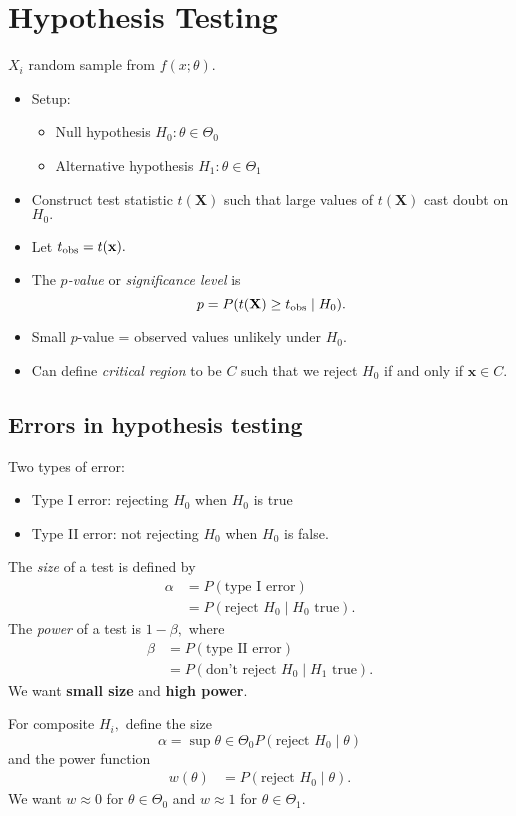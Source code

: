 \section{Hypothesis Testing}
$X_i$ random sample from $f(x; \theta).$
\begin{itemize}
	\item Setup:
		\begin{itemize}
			\item Null hypothesis $H_0\colon \theta \in \Theta_0$
			\item Alternative hypothesis $H_1\colon \theta \in \Theta_1$
		\end{itemize}
	\item Construct test statistic $t(\mathbf{X})$ such that large values of $t(\mathbf{X})$ cast doubt on $H_0.$
	\item Let $t_{\text{obs}} = t(\mathbf{x}).$
	\item The \textit{$p$-value} or \textit{significance level} is 
	\[ p = P(t(\mathbf{X}) \geq t_{\text{obs}} \mid H_0). \]
	\item Small $p$-value = observed values unlikely under $H_0.$
	\item Can define \textit{critical region} to be $C$ such that we reject $H_0$ if and only if $\mathbf{x} \in C.$
\end{itemize}

\subsection{Errors in hypothesis testing}
Two types of error:
\begin{itemize}
	\item Type I error: rejecting $H_0$ when $H_0$ is true
	\item Type II error: not rejecting $H_0$ when $H_0$ is false.
\end{itemize}
The \textit{size} of a test is defined by
\begin{align*}
	\alpha
	   &= P(\text{type I error}) \\
	   &= P(\text{reject } H_0 \mid H_0 \text{ true}).
\end{align*}
The \textit{power} of a test is $1-\beta,$ where
\begin{align*}
	\beta
	   &= P(\text{type II error}) \\
	   &= P(\text{don't reject } H_0 \mid H_1 \text{ true}).
\end{align*}
We want \textbf{small size} and \textbf{high power}.

For composite $H_i,$ define the size
\[ \alpha =  \sup{\theta \in \Theta_0}P(\text{reject } H_0 \mid \theta) \]
and the power function
\begin{align*}
	w(\theta)
	   &= P(\text{reject } H_0 \mid \theta).
\end{align*}
We want $w \approx 0$ for $\theta \in \Theta_0$ and $w \approx 1$ for $\theta \in \Theta_1.$

